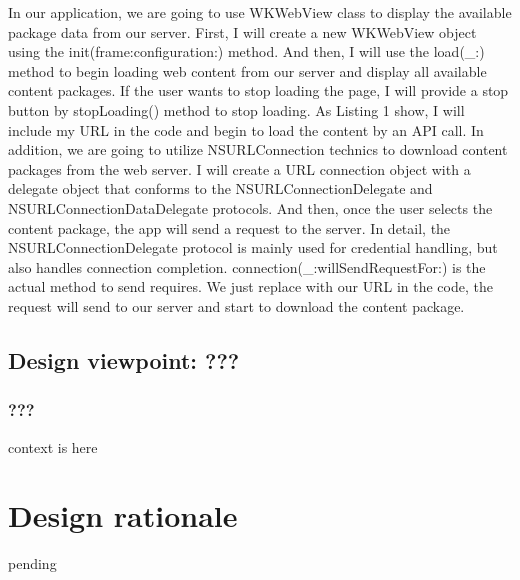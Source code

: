\documentclass[letterpaper, 10pt,titlepage]{article}
\begin{document}
In our application, we are going to use WKWebView class to display the available package data from our server. First, I will create a new WKWebView object using the init(frame:configuration:) method. And then, I will use the load(\_:) method to begin loading web content from our server and display all available content packages. If the user wants to stop loading the page, I will provide a stop button by stopLoading() method to stop loading. As Listing 1 show, I will include my URL in the code and begin to load the content by an API call. In addition, we are going to utilize NSURLConnection technics to download content packages from the web server. I will create a URL connection object with a delegate object that conforms to the NSURLConnectionDelegate and NSURLConnectionDataDelegate protocols. And then, once the user selects the content package, the app will send a request to the server. In detail, the NSURLConnectionDelegate protocol is mainly used for credential handling, but also handles connection completion. connection(\_:willSendRequestFor:) is the actual method to send requires. We just replace with our URL in the code, the request will send to our server and start to download the content package.



\subsection{Design viewpoint: ???}

\subsubsection{???}
context is here















\section{Design rationale}
pending
\end{document}
